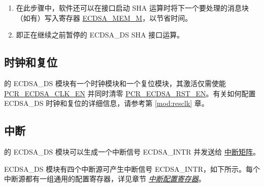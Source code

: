 \documentclass[main\_\_CN.tex]{subfiles}
\begin{document}
\begin{tiplisting}\label{others:ecdsa-note-sha}
\vspace{-2.5em}
\begin{enumerate}
\item 在此步骤中，软件还可以在接口启动 SHA 运算时将下一个要处理的消息块（如有）写入寄存器 \hyperref[tab:ecdsa-memory]{ECDSA\_MEM\_M}，以节省时间。
\item 即正在继续之前暂停的 ECDSA\_DS SHA 接口运算。
\end{enumerate}
\end{tiplisting}
\subsection{时钟和复位}

\chipname{} 的 ECDSA\_DS 模块有一个时钟模块和一个复位模块，其激活仅需使能 \hyperref[fielddesc:PCRECDSACLKEN]{PCR\_ECDSA\_CLK\_EN} 并同时清零 \hyperref[fielddesc:PCRECDSARSTEN]{PCR\_ECDSA\_RST\_EN}。有关如何配置 ECDSA\_DS 时钟和复位的详细信息，请参考第 \ref{mod:resclk} 章\textit{}。

\subsection{中断}
\label{sec:ecdsa-interrupt}

\chipname{} 的 ECDSA\_DS 模块可以生成一个中断信号 ECDSA\_INTR 并发送给 \hyperref[mod:intmtrx]{中断矩阵}。

ECDSA\_DS 模块有四个中断源可产生中断信号 ECDSA\_INTR，如下所示。每个中断源都有一组通用的配置寄存器，详见章节 \hyperref[interrupt-config-registers]{\textit{中断配置寄存器}}。
\end{document}
